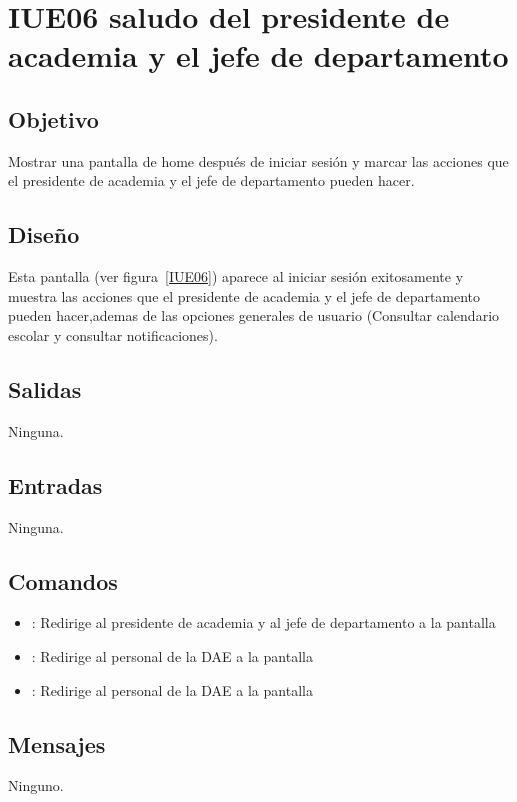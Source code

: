 \section{IUE06 saludo del presidente de academia y el jefe de departamento}

\subsection{Objetivo}
Mostrar una pantalla de home después de iniciar sesión y marcar las acciones que el presidente de academia y el jefe de departamento pueden hacer.

\subsection{Diseño}
Esta pantalla  (ver figura~\ref{IUE06}) aparece al iniciar sesión exitosamente y muestra las acciones que el presidente de academia y el jefe de departamento pueden hacer,ademas de las opciones generales de usuario (Consultar calendario escolar y consultar notificaciones). 


\subsection{Salidas}

Ninguna.

\subsection{Entradas}
Ninguna.

\subsection{Comandos}
\begin{itemize}
	\item {}: Redirige al presidente de academia y al jefe de departamento a la pantalla 
	\item {}: Redirige al personal de la DAE a la pantalla 
	\item {}: Redirige al personal de la DAE a la pantalla 
	
\end{itemize}

\subsection{Mensajes}

\begin{Citemize}
	\item Ninguno.
\end{Citemize}